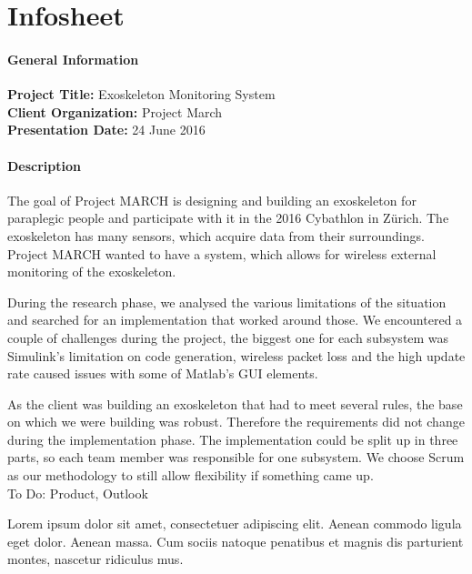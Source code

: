 \chapter{Infosheet}
\pagebreak
\begin{small}
\subsubsection{General Information}
{\bfseries Project Title:} Exoskeleton Monitoring System\\
{\bfseries Client Organization:} Project March\\
{\bfseries Presentation Date:} 24 June 2016

\subsubsection{Description}
The goal of Project MARCH is designing and building an exoskeleton for paraplegic people and participate with it in the 2016 Cybathlon in Zürich. The exoskeleton has many sensors, which acquire data from their surroundings. Project MARCH wanted to have a system, which allows for wireless external monitoring of the exoskeleton. 

During the research phase, we analysed the various limitations of the situation and searched for an implementation that worked around those. We encountered a couple of challenges during the project, the biggest one for each subsystem was Simulink's limitation on code generation, wireless packet loss and the high update rate caused issues with some of Matlab's GUI elements.  

As the client was building an exoskeleton that had to meet several rules, the base on which we were building was robust. Therefore the requirements did not change during the implementation phase. The implementation could be split up in three parts, so each team member was responsible for one subsystem. We choose Scrum as our methodology to still allow flexibility if something came up.\\

To Do: Product, Outlook

Lorem ipsum dolor sit amet, consectetuer adipiscing elit. Aenean commodo ligula eget dolor. Aenean massa. Cum sociis natoque penatibus et magnis dis parturient montes, nascetur ridiculus mus.

\end{small}
